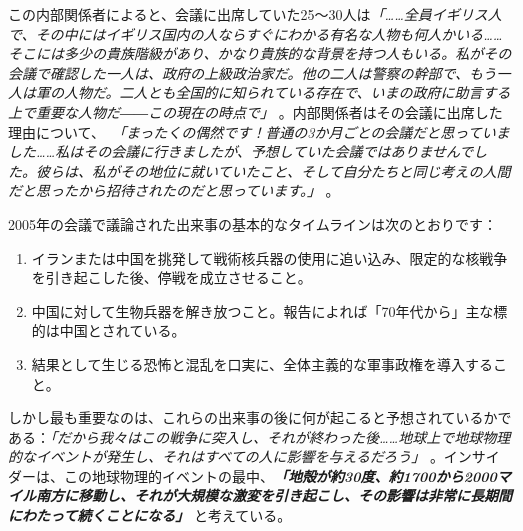 \documentclass[10pt,twocolumn,letterpaper]{article}
\begin{document}
この内部関係者によると、会議に出席していた25～30人は\textit{「……全員イギリス人で、その中にはイギリス国内の人ならすぐにわかる有名な人物も何人かいる……そこには多少の貴族階級があり、かなり貴族的な背景を持つ人もいる。私がその会議で確認した一人は、政府の上級政治家だ。他の二人は警察の幹部で、もう一人は軍の人物だ。二人とも全国的に知られている存在で、いまの政府に助言する上で重要な人物だ――この現在の時点で」} \cite{4}。内部関係者はその会議に出席した理由について、\ \textit{「まったくの偶然です！普通の3か月ごとの会議だと思っていました……私はその会議に行きましたが、予想していた会議ではありませんでした。彼らは、私がその地位に就いていたこと、そして自分たちと同じ考えの人間だと思ったから招待されたのだと思っています。」} \cite{4}。

2005年の会議で議論された出来事の基本的なタイムラインは次のとおりです：

\begin{flushleft}
\begin{enumerate}
    \item イランまたは中国を挑発して戦術核兵器の使用に追い込み、限定的な核戦争を引き起こした後、停戦を成立させること。
    \item 中国に対して生物兵器を解き放つこと。報告によれば「70年代から」主な標的は中国とされている。
    \item 結果として生じる恐怖と混乱を口実に、全体主義的な軍事政権を導入すること。
\end{enumerate}
\end{flushleft}

しかし最も重要なのは、これらの出来事の後に何が起こると予想されているかである：\textit{「だから我々はこの戦争に突入し、それが終わった後……地球上で地球物理的なイベントが発生し、それはすべての人に影響を与えるだろう」} \cite{4}。インサイダーは、この地球物理的イベントの最中、\textit{\textbf{「地殻が約30度、約1700から2000マイル南方に移動し、それが大規模な激変を引き起こし、その影響は非常に長期間にわたって続くことになる」}} \cite{4}と考えている。
\end{document}

